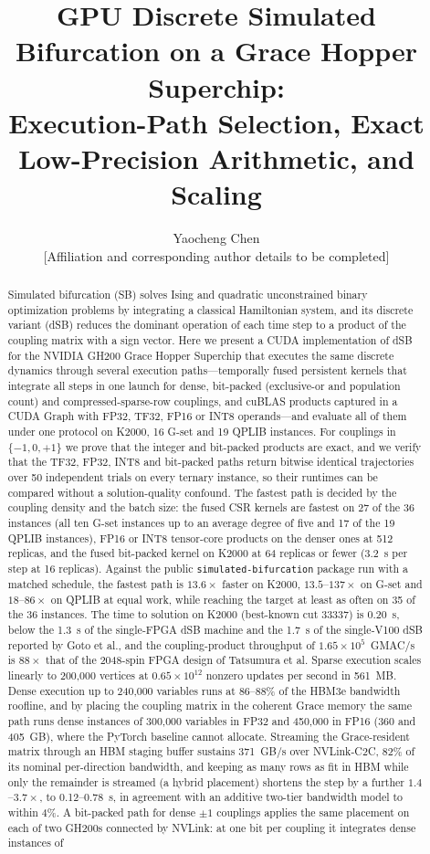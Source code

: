 \documentclass[11pt,a4paper]{article}
\title{GPU Discrete Simulated Bifurcation on a Grace Hopper Superchip:\\ Execution-Path Selection, Exact Low-Precision Arithmetic, and Scaling}
\author{Yaocheng Chen\\\small [Affiliation and corresponding author details to be completed]}
\date{}
\newcommand{\code}[1]{\texttt{#1}}
\begin{document}
\maketitle\thispagestyle{plain}
\begin{abstract}
Simulated bifurcation (SB) solves Ising and quadratic unconstrained binary optimization problems by integrating a classical Hamiltonian system, and its discrete variant (dSB) reduces the dominant operation of each time step to a product of the coupling matrix with a sign vector. Here we present a CUDA implementation of dSB for the NVIDIA GH200 Grace Hopper Superchip that executes the same discrete dynamics through several execution paths---temporally fused persistent kernels that integrate all steps in one launch for dense, bit-packed (exclusive-or and population count) and compressed-sparse-row couplings, and cuBLAS products captured in a CUDA Graph with FP32, TF32, FP16 or INT8 operands---and evaluate all of them under one protocol on K2000, 16 G-set and 19 QPLIB instances. For couplings in $\{-1,0,+1\}$ we prove that the integer and bit-packed products are exact, and we verify that the TF32, FP32, INT8 and bit-packed paths return bitwise identical trajectories over 50 independent trials on every ternary instance, so their runtimes can be compared without a solution-quality confound. The fastest path is decided by the coupling density and the batch size: the fused CSR kernels are fastest on 27 of the 36 instances (all ten G-set instances up to an average degree of five and 17 of the 19 QPLIB instances), FP16 or INT8 tensor-core products on the denser ones at 512 replicas, and the fused bit-packed kernel on K2000 at 64 replicas or fewer (3.2~\textmu s per step at 16 replicas). Against the public \code{simulated-bifurcation} package run with a matched schedule, the fastest path is $13.6\times$ faster on K2000, $13.5$--$137\times$ on G-set and $18$--$86\times$ on QPLIB at equal work, while reaching the target at least as often on 35 of the 36 instances. The time to solution on K2000 (best-known cut 33337) is 0.20~s, below the 1.3~s of the single-FPGA dSB machine and the 1.7~s of the single-V100 dSB reported by Goto et al., and the coupling-product throughput of $1.65\times10^{5}$~GMAC/s is $88\times$ that of the 2048-spin FPGA design of Tatsumura et al. Sparse execution scales linearly to 200,000 vertices at $0.65\times10^{12}$ nonzero updates per second in 561~MB. Dense execution up to 240,000 variables runs at 86--88\% of the HBM3e bandwidth roofline, and by placing the coupling matrix in the coherent Grace memory the same path runs dense instances of 300,000 variables in FP32 and 450,000 in FP16 (360 and 405~GB), where the PyTorch baseline cannot allocate. Streaming the Grace-resident matrix through an HBM staging buffer sustains 371~GB/s over NVLink-C2C, 82\% of its nominal per-direction bandwidth, and keeping as many rows as fit in HBM while only the remainder is streamed (a hybrid placement) shortens the step by a further $1.4$--$3.7\times$, to 0.12--0.78~s, in agreement with an additive two-tier bandwidth model to within 4\%. A bit-packed path for dense $\pm1$ couplings applies the same placement on each of two GH200s connected by NVLink: at one bit per coupling it integrates dense instances of 
\end{abstract}
\end{document}
